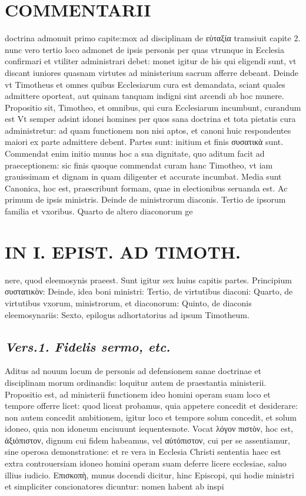 \documentclass{article}
\begin{document}
\begin{pages}
\section*{COMMENTARII }
\marginpar{[ p.60 ]}\pstart doctrina admonuit primo capite:mox ad disciplinam de εὐταξία tramsiuit capite 2. nunc vero tertio loco admonet de ipsis personis per quas vtrunque in Ecclesia confirmari et vtiliter administrari debet: monet igitur de his qui eligendi sunt, vt discant iuniores quasnam virtutes ad ministerium sacrum afferre debeant. Deinde vt Timotheus et omnes quibus Ecclesiarum cura est demandata, sciant quales admittere oporteat, aut quinam tanquam indigni sint arcendi ab hoc munere.  \pend\pstart Propositio sit, Timotheo, et omnibus, qui cura Ecclesiarum incumbunt, curandum est Vt semper adsint idonei homines per quos sana doctrina et tota pietatis cura administretur: ad quam functionem non nisi aptos, et canoni huic respondentes maiori ex parte admittere debent.  \pend\pstart Partes sunt: initium et finis συσατικὰ sunt. Commendat enim initio munus hoc a sua dignitate, quo aditum facit ad praeceptionem: sic finis quoque commendat curam hanc Timotheo, vt iam grauissimam et dignam in quam diligenter et accurate incumbat. Media sunt Canonica, hoc est, praescribunt formam, quae in electionibus seruanda est. Ac primum de ipsis ministris. Deinde de ministrorum diaconis. Tertio de ipsorum familia et vxoribus. Quarto de altero diaconorum ge\pend
\section*{IN I. EPIST. AD TIMOTH. }
\marginpar{[ p.61 ]}\pstart nere, quod eleemosynis praeest. Sunt igitur sex huius capitis partes. Principium συστατικὸν: Deinde, idea boni ministri: Tertio, de virtutibus diaconi: Quarto, de virtutibus vxorum, ministrorum, et diaconorum: Quinto, de diaconis eleemosynariis: Sexto, epilogus adhortatorius ad ipsum Timotheum.  \pend
{}
{}
\subsection*{\textit{Vers.1. Fidelis sermo, etc. }}\pstart Aditus ad nouum locum de personis ad defensionem sanae doctrinae et disciplinam morum ordinandis: loquitur autem de praestantia ministerii. Propositio est, ad ministerii functionem ideo homini operam suam loco et tempore offerre licet: quod liceat probamus, quia appetere concedit et desiderare: non autem concedit ambitionem, igitur loco et tempore solum concedit, et solum idoneo, quia non idoneum enciuuunt iequentesnote.  \pend\pstart Vocat λόγον πιστὸν, hoc est, ἀξιόπιστον, dignum cui fidem habeamus, vel αὐτόπιστον, cui per se assentiamur, sine operosa demonstratione: et re vera in Ecclesia Christi sententia haec est extra controuersiam idoneo homini operam suam deferre licere ecclesiae, saluo illius iudicio.  \pend\pstart Επισκοπὴ, munus docendi dicitur, hinc Episcopi, qui hodie ministri et simpliciter concionatores dicuntur: nomen habent ab inspi\pend

\end{pages}
\end{document}
